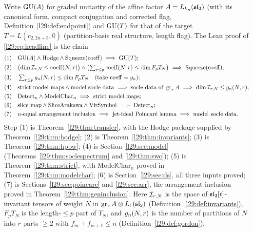 \begin{remark}\label{l29:rem:arc}
Write $\mathrm{GU}(A)$ for graded unitarity of the affine factor $A=L_{k_n}(\mathfrak{sl}_2)$ (with its canonical
form, compact conjugation and corrected flag, Definition~\ref{l29:def:endpoint}) and $\mathrm{GU}(T)$ for that of
the target $T=L(c_{2,2n+3},0)$ (partition-basis real structure, length flag). The Lean proof of
\eqref{l29:eq:headline} is the chain
\begin{equation}\label{l29:eq:chain}
\begin{aligned}
&\text{(1)}\quad \ltwentynineGU(A)\wedge\mathrm{Hodge}\wedge\mathrm{Squeeze}(\mathrm{coeff})\ \Longrightarrow\ \ltwentynineGU(T);\\
&\text{(2)}\quad \bigl(\dim\ltwentynineinv_{r,N}\le\mathrm{coeff}(N,r)\bigr)\wedge
  \bigl(\textstyle\sum_{r\le p}\mathrm{coeff}(N,r)\le\dim F_pT_N\bigr)\ \Longrightarrow\ \mathrm{Squeeze}(\mathrm{coeff});\\
&\text{(3)}\quad \textstyle\sum_{r\le p}\ltwentyninegc_n(N,r)\le\dim F_pT_N\quad(\text{take }\mathrm{coeff}=\ltwentyninegc_n);\\
&\text{(4)}\quad \text{strict model maps}\wedge\text{model socle data}\ \Longrightarrow\ \text{socle data of }\ltwentyninegr_rA
  \ \Longrightarrow\ \dim\ltwentynineinv_{r,N}\le\ltwentyninegc_n(N,r);\\
&\text{(5)}\quad \mathrm{Detect}_n\wedge\mathrm{ModelChar}_n\ \Longrightarrow\ \text{strict model maps};\\
&\text{(6)}\quad \text{slice map}\wedge\text{SliceArakawa}\wedge\text{VirSymbol}\ \Longrightarrow\ \mathrm{Detect}_n;\\
&\text{(7)}\quad \text{$n$-equal arrangement inclusion}\ \Longrightarrow\ \text{jet-ideal Poincar\'e lemma}
  \ \Longrightarrow\ \text{model socle data}.
\end{aligned}
\end{equation}
Step (1) is Theorem~\ref{l29:thm:transfer}, with the Hodge package supplied by Theorem~\ref{l29:thm:hodge}; (2) is
Theorem~\ref{l29:thm:invariants}; (3) is Theorem~\ref{l29:thm:hpbw}; (4) is Section~\ref{l29:sec:model}
(Theorems~\ref{l29:thm:soclespectrum} and \ref{l29:thm:swc}); (5) is Theorem~\ref{l29:thm:strict}, with
$\mathrm{ModelChar}_n$ proved in Theorem~\ref{l29:thm:modelchar}; (6) is Section~\ref{l29:sec:ds}, all three inputs
proved; (7) is Sections~\ref{l29:sec:poincare} and \ref{l29:sec:arr}, the arrangement inclusion proved in
Theorem~\ref{l29:thm:geninclusion}.
Here $\mathcal I_{r,N}$ is the space of $\mathfrak{sl}_2[t]$-invariant tensors of weight $N$ in
$\operatorname{gr}_rA\otimes L_1(\mathfrak{sl}_2)$ (Definition~\ref{l29:def:invariants}), $F_pT_N$ is the length-$\le p$
part of $T_N$, and $g_n(N,r)$ is the number of partitions of $N$ into $r$ parts $\ge2$ with
$f_m+f_{m+1}\le n$ (Definition~\ref{l29:def:gordon}).


\end{remark}
